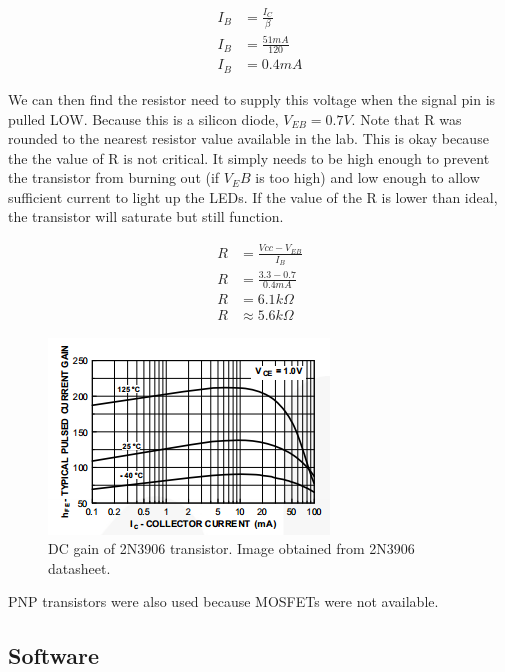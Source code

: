 \documentclass[11pt]{article}
\begin{document}
\begin{align*}
I_{B} &= \frac{I_{C}}{\beta} \\
I_{B} &= \frac{51mA}{120} \\
I_{B} &= 0.4mA
\end{align*}

We can then find the resistor need to supply this voltage when the signal pin is pulled LOW. Because this is a silicon diode, $V_{EB}=0.7V$.  Note that R was rounded to the nearest resistor value available in the lab. This is okay because the the value of R is not critical. It simply needs to be high enough to prevent the transistor from burning out (if $V_EB$ is too high) and low enough to allow sufficient current to light up the LEDs. If the value of the R is lower than ideal, the transistor will saturate but still function.

\begin{align*}
R &= \frac{Vcc-V_{EB}}{I_{B}} \\
R &= \frac{3.3-0.7}{0.4mA} \\
R &= 6.1k\Omega	\\
R &\approx 5.6k\Omega
\end{align*}



\begin{figure}[h!]
\centering
\includegraphics[scale=1]{2N3906_gain.png}
\caption{DC gain of 2N3906 transistor. Image obtained from 2N3906 datasheet.}
\label{fig:2N3906_gain}
\end{figure} 





PNP transistors were also used because MOSFETs were not available. 

\subsection{Software}
\end{document}
